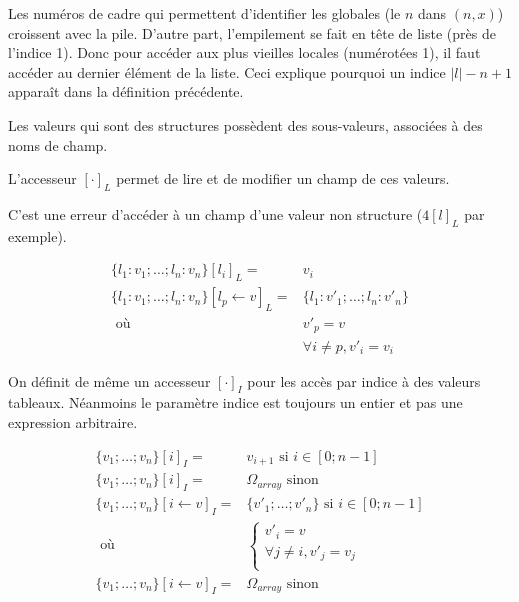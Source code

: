 Les numéros de cadre qui permettent d'identifier les globales (le $n$ dans $(n,
x)$) croissent avec la pile. D'autre part, l'empilement se fait en tête de liste
(près de l'indice 1). Donc pour accéder aux plus vieilles locales (numérotées
1), il faut accéder au dernier élément de la liste. Ceci explique pourquoi un
indice $|l|-n+1$ apparaît dans la définition précédente.

\begin{definition}

  Les valeurs qui sont des structures possèdent des sous-valeurs, associées à
  des noms de champ.

  L'accesseur $[ \cdot ]_L$ permet de lire et de modifier un champ de ces
  valeurs.

  C'est une erreur d'accéder à un champ d'une valeur non structure ($4[l]_L$ par
  exemple).

  \begin{align*}
    \{ l_1 : v_1; … ; l_n : v_n \}[l_i]_L = & v_i \\
    \{ l_1 : v_1; … ; l_n : v_n \}[l_p ← v]_L = & \{ l_1 : v'_1; … ; l_n : v'_n \} \\
          \mbox{ où } & v'_p = v \\
                      & ∀ i ≠ p, v'_i = v_i
  \end{align*}

\end{definition}

\begin{definition}

  On définit de même un accesseur $[\cdot]_I$ pour les accès par indice à des
  valeurs tableaux. Néanmoins le paramètre indice est toujours un entier et pas
  une expression arbitraire.

  \begin{align*}
    \{ v_1 ; … ; v_n \} [i]_I   = & v_{i+1} \textrm{ si } i ∈ [0;n-1] \\
    \{ v_1 ; … ; v_n \} [i]_I   = & Ω_{array} \textrm{ sinon} \\
    \{ v_1 ; … ; v_n \} [i←v]_I = & \{ v'_1 ; … ; v'_n \} \textrm{ si } i ∈ [0;n-1] \\
                      \mbox{ où } & \begin{cases}
                                      v'_i = v \\
                                      ∀j≠i, v'_j = v_j \\
                                    \end{cases} \\
    \{ v_1 ; … ; v_n \} [i←v]_I = & Ω_{array} \textrm{ sinon} \\
  \end{align*}


\end{definition}

